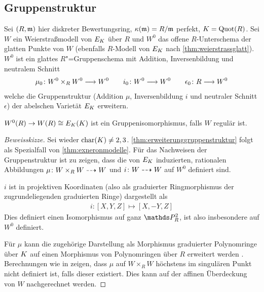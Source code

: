 \documentclass[german]{scrreprt}
\begin{document}
\subsection{Gruppenstruktur}
\begin{Lemma}\label{thm:erweiterunggruppenstruktur}
  Sei $(R,\mathfrak{m})$ hier diskreter Bewertungsring,
  $\kappa(\mathfrak{m})=R/\mathfrak{m}$ perfekt,
  $K=\operatorname{Quot}(R)$.
  Sei $W$ ein Weierstraßmodell von $E_{K}$ über $R$ und
  $W^0$ das offene $R$-Unterschema der glatten Punkte von $W$ 
  (ebenfalls $R$-Modell von $E_{K}$ nach \autoref{thm:weierstrassglatt}).
  $W^0$ ist ein glattes $R$"=Gruppenschema
  mit Addition, Inversenbildung und neutralem Schnitt
  \begin{gather*}
    \mu_0\colon W^0\times_R W^0 \longrightarrow W^0
    \qquad
    i_0\colon W^0\longrightarrow W^0
    \qquad
    \epsilon_0\colon R\longrightarrow W^0
  \end{gather*}
  welche die Gruppenstruktur (Addition $\mu$, Inversenbildung $i$ und
  neutraler Schnitt $\epsilon$)
  der abelschen Varietät $E_{K}$ erweitern.

  $W^0(R)\to W(R) \cong E_{K}(K)$ ist ein Gruppenisomorphismus,
  falls $W$ regulär ist.
  
  \begin{proof}[Beweisskizze] Sei wieder $\operatorname{char}(K)\neq 2,3$.
    \autoref{thm:erweiterunggruppenstruktur} folgt als Spezialfall von
    \autoref{thm:exneronmodelle}.
    Für das Nachweisen der Gruppenstruktur ist zu zeigen, dass die von
    $E_{K}$ induzierten, rationalen Abbildungen $\mu\colon W\times_R
    W\dashrightarrow W$ und $i\colon W\dashrightarrow W$ auf $W^0$ definiert sind.

    $i$ ist in projektiven Koordinaten (also als graduierter
    Ringmorphismus der zugrundeliegenden graduierten Ringe)
    dargestellt als
    \begin{gather*}
      i\colon [X,Y,Z]\mapsto [X,-Y,Z]
    \end{gather*}
    Dies definiert einen Isomorphismus auf ganz $\P_R^2$, ist also
    insbesondere auf $W^0$ definiert.

    Für $\mu$ kann die zugehörige Darstellung als Morphismus
    graduierter Polynomringe über $K$ auf einen Morphismus von
    Polynomringen über $R$ erweitert werden \cite[vgl. Formeln für
    Addition in][Group Law Algorithm III.2.3]{silverman}.
    Berechnungen wie in \cite[Proposition 2.5]{silverman} zeigen, dass
    $\mu$ auf $W\times_R W$ höchstens im singulären Punkt nicht
    definiert ist, falls dieser existiert.
    Dies kann auf der affinen Überdeckung von $W$ nachgerechnet werden.
    

\end{proof}
\end{Lemma}
\end{document}
